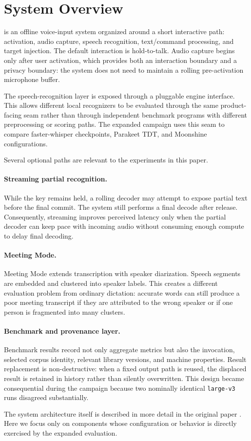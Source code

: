 \section{System Overview}

\YazSes{} is an offline voice-input system organized around a short interactive path:
activation, audio capture, speech recognition, text/command processing, and target injection.
The default interaction is hold-to-talk. Audio capture begins only after user activation, which
provides both an interaction boundary and a privacy boundary: the system does not need to maintain
a rolling pre-activation microphone buffer.

The speech-recognition layer is exposed through a pluggable engine interface. This allows
different local recognizers to be evaluated through the same product-facing seam rather than
through independent benchmark programs with different preprocessing or scoring paths. The
expanded campaign uses this seam to compare faster-whisper checkpoints, Parakeet TDT, and
Moonshine configurations.

Several optional paths are relevant to the experiments in this paper.

\paragraph{Streaming partial recognition.}
While the key remains held, a rolling decoder may attempt to expose partial text before the final
commit. The system still performs a final decode after release. Consequently, streaming improves
perceived latency only when the partial decoder can keep pace with incoming audio without
consuming enough compute to delay final decoding.

\paragraph{Meeting Mode.}
Meeting Mode extends transcription with speaker diarization. Speech segments are embedded and
clustered into speaker labels. This creates a different evaluation problem from ordinary
dictation: accurate words can still produce a poor meeting transcript if they are attributed to
the wrong speaker or if one person is fragmented into many clusters.

\paragraph{Benchmark and provenance layer.}
Benchmark results record not only aggregate metrics but also the invocation, selected corpus
identity, relevant library versions, and machine properties. Result replacement is
non-destructive: when a fixed output path is reused, the displaced result is retained in history
rather than silently overwritten. This design became consequential during the campaign because
two nominally identical \texttt{large-v3} runs disagreed substantially.

The system architecture itself is described in more detail in the original \YazSes{} paper
\citep{yazses2026v1}. Here we focus only on components whose configuration or behavior is directly
exercised by the expanded evaluation.
